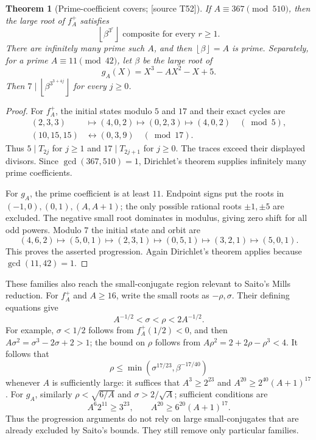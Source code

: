 \documentclass[11pt,a4paper]{article}
\newtheorem{theorem}{Theorem}[section]
\theoremstyle{definition}\newtheorem{definition}[theorem]{Definition}
\theoremstyle{remark}\newtheorem{remark}[theorem]{Remark}
\newcommand{\floor}[1]{\left\lfloor #1\right\rfloor}\newcommand{\ceil}[1]{\left\lceil #1\right\rceil}
\newcommand{\sourceT}[1]{\textup{[source T#1]}}
\begin{document}
\begin{theorem}[Prime-coefficient covers; \sourceT{52}]\label{thm:prime-coeff}
If $A\equiv367\pmod{510}$, then the large root of $f_A^+$ satisfies
\[
 \floor{\beta^{3^r}}\text{ composite for every }r\ge1.
\]
There are infinitely many prime such $A$, and then $\floor\beta=A$ is prime. Separately, for a prime $A\equiv11\pmod{42}$, let $\beta$ be the large root of
\[
 g_A(X)=X^3-AX^2-X+5.
\]
Then $7\mid\floor{\beta^{3^{3+4j}}}$ for every $j\ge0$.
\end{theorem}
\begin{proof}
For $f_A^+$, the initial states modulo $5$ and $17$ and their exact cycles are
\[
\begin{split}
 (2,3,3)&\mapsto(4,0,2)\mapsto(0,2,3)\mapsto(4,0,2)\quad(\bmod5),\\
 (10,15,15)&\leftrightarrow(0,3,9)\quad(\bmod17).
\end{split}
\]
Thus $5\mid T_{2j}$ for $j\ge1$ and $17\mid T_{2j+1}$ for $j\ge0$. The traces exceed their displayed divisors. Since $\gcd(367,510)=1$, Dirichlet's theorem supplies infinitely many prime coefficients.

For $g_A$, the prime coefficient is at least $11$. Endpoint signs put the roots in $(-1,0),(0,1),(A,A+1)$; the only possible rational roots $\pm1,\pm5$ are excluded. The negative small root dominates in modulus, giving zero shift for all odd powers. Modulo $7$ the initial state and orbit are
\[
 (4,6,2)\mapsto(5,0,1)\mapsto(2,3,1)\mapsto(0,5,1)
 \mapsto(3,2,1)\mapsto(5,0,1).
\]
This proves the asserted progression. Again Dirichlet's theorem applies because $\gcd(11,42)=1$.
\end{proof}
These families also reach the small-conjugate region relevant to Saito's Mills reduction. For $f_A^+$ and $A\ge16$, write the small roots as $-\rho,\sigma$. Their defining equations give
\[
 A^{-1/2}<\sigma<\rho<2A^{-1/2}.
\]
For example, $\sigma<1/2$ follows from $f_A^+(1/2)<0$, and then $A\sigma^2=\sigma^3-2\sigma+2>1$; the bound on $\rho$ follows from $A\rho^2=2+2\rho-\rho^3<4$. It follows that
\[
 \rho\le\min(\sigma^{17/23},\beta^{-17/40})
\]
whenever $A$ is sufficiently large: it suffices that
$A^3\ge2^{23}$ and $A^{20}\ge2^{40}(A+1)^{17}$.
For $g_A$, similarly $\rho<\sqrt{6/A}$ and $\sigma>2/\sqrt A$; sufficient conditions are
\[
 A^6 2^{11}\ge3^{23},\qquad A^{20}\ge6^{20}(A+1)^{17}.
\]
Thus the progression arguments do not rely on large small-conjugates that are already excluded by Saito's bounds. They still remove only particular families.
\end{document}
